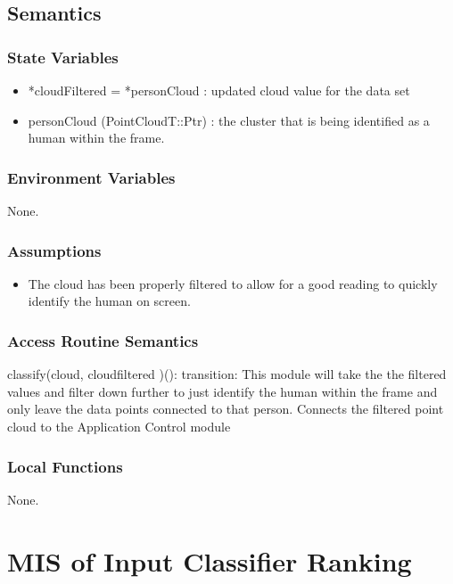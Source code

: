 \documentclass[12pt, titlepage]{article}
\begin{document}
\subsection{Semantics}

\subsubsection{State Variables}

\begin{itemize}
  \item *cloudFiltered = *personCloud : updated cloud value for the data set
  \item personCloud (PointCloudT::Ptr) : the cluster that is being identified as a human within the frame.
\end{itemize}

\subsubsection{Environment Variables}

None.

\subsubsection{Assumptions}

\begin{itemize}
  \item The cloud has been properly filtered to allow for a good reading to quickly identify the human on screen.
\end{itemize}

\subsubsection{Access Routine Semantics}

\noindent classify(cloud, cloudfiltered )():
transition: This module will take the the filtered values and filter down further to just identify the human within the frame and only leave the data points connected to that person.
Connects the filtered point cloud to the Application Control module
\subsubsection{Local Functions}

None.
\newpage

\section{MIS of Input Classifier Ranking} \label{ModuleICR} 
\end{document}
